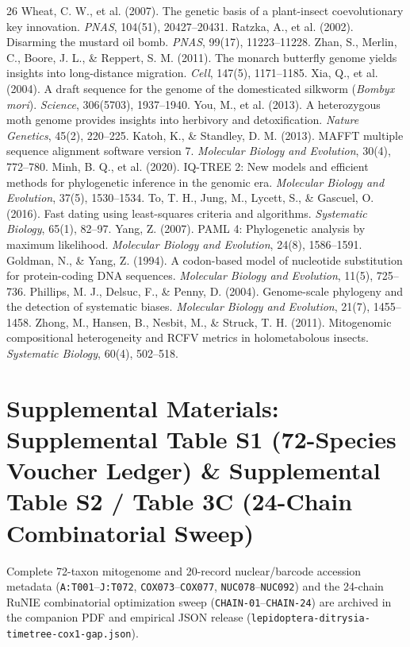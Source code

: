 \documentclass[10pt,letterpaper]{article}
\begin{document}
\begin{thebibliography}{26}
 Wheat, C. W., et al. (2007). The genetic basis of a plant-insect coevolutionary key innovation. \textit{PNAS}, 104(51), 20427--20431.
 Ratzka, A., et al. (2002). Disarming the mustard oil bomb. \textit{PNAS}, 99(17), 11223--11228.
 Zhan, S., Merlin, C., Boore, J. L., \& Reppert, S. M. (2011). The monarch butterfly genome yields insights into long-distance migration. \textit{Cell}, 147(5), 1171--1185.
 Xia, Q., et al. (2004). A draft sequence for the genome of the domesticated silkworm (\textit{Bombyx mori}). \textit{Science}, 306(5703), 1937--1940.
 You, M., et al. (2013). A heterozygous moth genome provides insights into herbivory and detoxification. \textit{Nature Genetics}, 45(2), 220--225.
 Katoh, K., \& Standley, D. M. (2013). MAFFT multiple sequence alignment software version 7. \textit{Molecular Biology and Evolution}, 30(4), 772--780.
 Minh, B. Q., et al. (2020). IQ-TREE 2: New models and efficient methods for phylogenetic inference in the genomic era. \textit{Molecular Biology and Evolution}, 37(5), 1530--1534.
 To, T. H., Jung, M., Lycett, S., \& Gascuel, O. (2016). Fast dating using least-squares criteria and algorithms. \textit{Systematic Biology}, 65(1), 82--97.
 Yang, Z. (2007). PAML 4: Phylogenetic analysis by maximum likelihood. \textit{Molecular Biology and Evolution}, 24(8), 1586--1591.
 Goldman, N., \& Yang, Z. (1994). A codon-based model of nucleotide substitution for protein-coding DNA sequences. \textit{Molecular Biology and Evolution}, 11(5), 725--736.
 Phillips, M. J., Delsuc, F., \& Penny, D. (2004). Genome-scale phylogeny and the detection of systematic biases. \textit{Molecular Biology and Evolution}, 21(7), 1455--1458.
 Zhong, M., Hansen, B., Nesbit, M., \& Struck, T. H. (2011). Mitogenomic compositional heterogeneity and RCFV metrics in holometabolous insects. \textit{Systematic Biology}, 60(4), 502--518.
\end{thebibliography}

\section{Supplemental Materials: Supplemental Table S1 (72-Species Voucher Ledger) \& Supplemental Table S2 / Table 3C (24-Chain Combinatorial Sweep)}
Complete 72-taxon mitogenome and 20-record nuclear/barcode accession metadata (\texttt{A:T001}--\texttt{J:T072}, \texttt{COX073}--\texttt{COX077}, \texttt{NUC078}--\texttt{NUC092}) and the 24-chain RuNIE combinatorial optimization sweep (\texttt{CHAIN-01}--\texttt{CHAIN-24}) are archived in the companion PDF and empirical JSON release (\texttt{lepidoptera-ditrysia-timetree-cox1-gap.json}).
\end{document}
